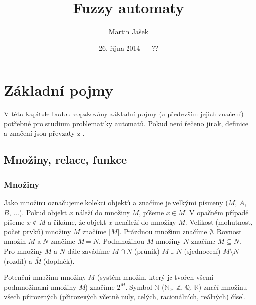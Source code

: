 \documentclass[a4paper,10pt]{article}
\title{Fuzzy automaty}
\author{Martin Jašek}
\date{26. října 2014 --- ??}
\begin{document}
\maketitle
\tableofcontents

\newpage

\section{Základní pojmy}\label{basic-concepts}
V této kapitole budou zopakovány základní pojmy (a především jejich značení) potřebné pro studium problematiky automatů. Pokud není řečeno jinak, definice a značení jsou převzaty z \cite{belohlavek-fuz-rel-syss}.

\subsection{Množiny, relace, funkce}
\subsubsection*{Množiny}
Jako množinu označujeme kolekci objektů a značíme je velkými písmeny ($M$, $A$, $B$, $\dots$). Pokud objekt $x$ náleží do množiny $M$, píšeme $x \in M$. V opačném případě píšeme $x \notin M$ a říkáme, že objekt $x$ nenáleží do množiny $M$. Velikost (mohutnost, počet prvků) množiny $M$ značíme $|M|$. Prázdnou množinu značíme $\emptyset$. Rovnost množin $M$ a $N$ značíme $M = N$. Podmnožinou $M$ množiny $N$ značíme $M \subseteq N$. 
Pro množiny $M$ a $N$ dále zavádíme $M \cap N$ (průnik) $M \cup N $ (sjednocení) $M \setminus N$ (rozdíl) a $\overline{M}$ (doplněk).

Potenční množinu množiny $M$ (systém množin, který je tvořen všemi podmnožinami množiny $M$) značíme $2^M$. Symbol $\mathbb{N}$ ($\mathbb{N}_0$, $\mathbb{Z}$, $\mathbb{Q}$, $\mathbb{R}$) značí množinu všech přirozených (přirozených včetně nuly, celých, racionálních, reálných) čísel.
\end{document}
